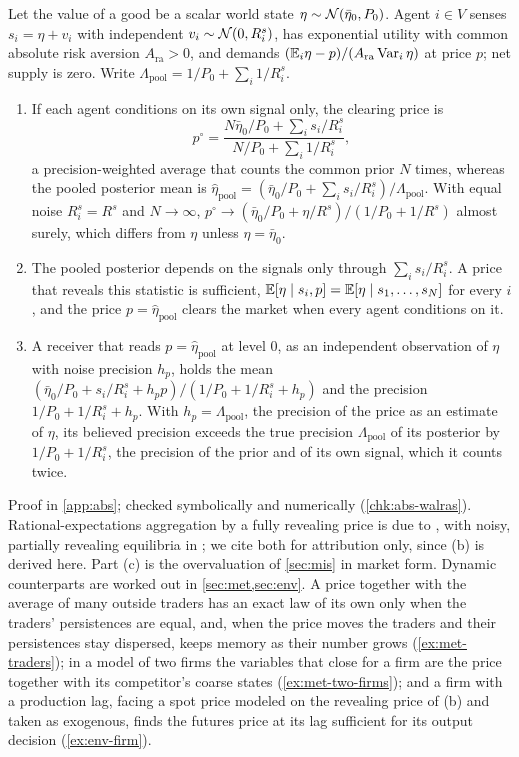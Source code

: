 \begin{proposition}\label{prop:abs-walras}
Let the value of a good be a scalar world state $\eta\sim\mathcal{N}(\bar\eta_0,P_0)$. Agent $i\in V$ senses $s_i=\eta+v_i$ with independent $v_i\sim\mathcal{N}(0,R^s_i)$, has exponential utility with common absolute risk aversion $A_{\mathrm{ra}}>0$, and demands $(\mathbb{E}_i\eta-p)/(A_{\mathrm{ra}}\operatorname{Var}_i\eta)$ at price $p$; net supply is zero. Write $\Lambda_{\mathrm{pool}}=1/P_0+\sum_i1/R^s_i$.
\begin{enumerate}
\item[(a)] If each agent conditions on its own signal only, the clearing price is
\[
p^\circ=\frac{N\bar\eta_0/P_0+\sum_is_i/R^s_i}{N/P_0+\sum_i1/R^s_i},
\]
a precision-weighted average that counts the common prior $N$ times, whereas the pooled posterior mean is $\hat\eta_{\mathrm{pool}}=(\bar\eta_0/P_0+\sum_is_i/R^s_i)/\Lambda_{\mathrm{pool}}$. With equal noise $R^s_i=R^s$ and $N\to\infty$, $p^\circ\to(\bar\eta_0/P_0+\eta/R^s)/(1/P_0+1/R^s)$ almost surely, which differs from $\eta$ unless $\eta=\bar\eta_0$.
\item[(b)] The pooled posterior depends on the signals only through $\sum_is_i/R^s_i$. A price that reveals this statistic is sufficient, $\mathbb{E}[\eta\mid s_i,p]=\mathbb{E}[\eta\mid s_1,\dots,s_N]$ for every $i$, and the price $p=\hat\eta_{\mathrm{pool}}$ clears the market when every agent conditions on it.
\item[(c)] A receiver that reads $p=\hat\eta_{\mathrm{pool}}$ at level 0, as an independent observation of $\eta$ with noise precision $h_p$, holds the mean $(\bar\eta_0/P_0+s_i/R^s_i+h_pp)/(1/P_0+1/R^s_i+h_p)$ and the precision $1/P_0+1/R^s_i+h_p$. With $h_p=\Lambda_{\mathrm{pool}}$, the precision of the price as an estimate of $\eta$, its believed precision exceeds the true precision $\Lambda_{\mathrm{pool}}$ of its posterior by $1/P_0+1/R^s_i$, the precision of the prior and of its own signal, which it counts twice.
\end{enumerate}
\end{proposition}

Proof in \cref{app:abs}; checked symbolically and numerically (\cref{chk:abs-walras}). Rational-expectations aggregation by a fully revealing price is due to \citet{grossman1976efficiency}, with noisy, partially revealing equilibria in \citet{hellwig1980aggregation}; we cite both for attribution only, since (b) is derived here. Part (c) is the overvaluation of \cref{sec:mis} in market form. Dynamic counterparts are worked out in \cref{sec:met,sec:env}. A price together with the average of many outside traders has an exact law of its own only when the traders' persistences are equal, and, when the price moves the traders and their persistences stay dispersed, keeps memory as their number grows (\cref{ex:met-traders}); in a model of two firms the variables that close for a firm are the price together with its competitor's coarse states (\cref{ex:met-two-firms}); and a firm with a production lag, facing a spot price modeled on the revealing price of (b) and taken as exogenous, finds the futures price at its lag sufficient for its output decision (\cref{ex:env-firm}).

